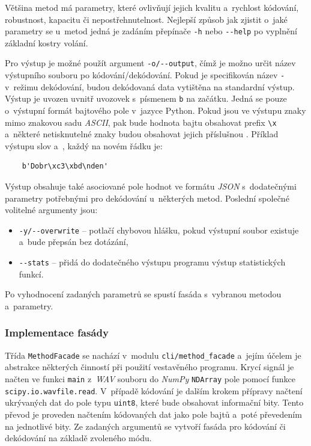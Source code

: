 Většina metod má parametry, které ovlivňují jejich kvalitu a~rychlost kódování,
robustnost, kapacitu či nepostřehnutelnost. Nejlepší způsob jak zjistit o~jaké
parametry se u~metod jedná je zadáním přepínače \verb|-h| nebo \verb|--help| po
vyplnění základní kostry volání.

Pro výstup je možné použít argument \verb|-o/--output|, čímž je možno určit
název výstupního souboru po kódování/dekódování. Pokud je specifikován název
\texttt{-} v~režimu dekódování, budou dekódovaná data vytištěna na standardní
výstup. Výstup je uvozen uvnitř uvozovek s~písmenem \texttt{b} na začátku.
Jedná se pouze o~výstupní formát bajtového pole v~jazyce Python. Pokud jsou ve
výstupu znaky mimo znakovou sadu \textit{ASCII}, pak bude hodnota bajtu
obsahovat prefix \verb|\x| a~některé netisknutelné znaky budou obsahovat jejich
příslušnou . Příklad výstupu slov  a~,
každý na novém řádku je:

\begin{verbatim}
    b'Dobr\xc3\xbd\nden'
\end{verbatim}

\noindent Výstup obsahuje také asociované pole hodnot ve formátu \textit{JSON}
s~dodatečnými parametry potřebnými pro dekódování u~některých metod. Poslední
společné volitelné argumenty jsou:

\begin{itemize}
    \item \verb|-y/--overwrite| -- potlačí chybovou hlášku, pokud výstupní
        soubor existuje a~bude přepsán bez dotázání,
    \item \verb|--stats| -- přidá do dodatečného výstupu programu výstup
        statistických funkcí.
\end{itemize}

\noindent Po vyhodnocení zadaných parametrů se spustí fasáda s~vybranou metodou
a~parametry.

\subsubsection*{Implementace fasády}
\label{ssub:facade-implementation}

Třída \texttt{MethodFacade} se nachází v~modulu \texttt{cli/method\_facade}
a~jejím účelem je abstrakce některých činností při použití vestavěného
programu. Krycí signál je načten ve funkci \texttt{main} z~\textit{WAV} souboru
do \textit{NumPy} \texttt{NDArray} pole pomocí funkce
\texttt{scipy.io.wavfile.read}. V~případě kódování je dalším krokem přípravy
načtení ukrývaných dat do pole typu \texttt{uint8}, které bude obsahovat
informační bity. Tento převod je proveden načtením kódovaných dat jako pole
bajtů a~poté převedením na jednotlivé bity. Ze zadaných argumentů se vytvoří
fasáda pro kódování či dekódování na základě zvoleného módu. 

